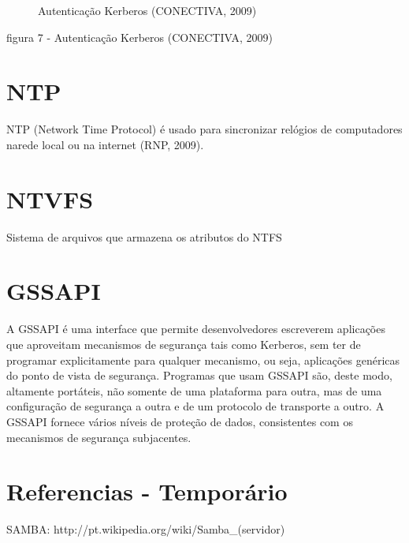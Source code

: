 \begin{figure}[ht]
   	\centering
   	\caption{Autenticação Kerberos (CONECTIVA, 2009)}
    \label{kerberos}
\end{figure}
figura 7 - Autenticação Kerberos (CONECTIVA, 2009)

\section{NTP}

NTP (Network Time Protocol) é usado para sincronizar relógios de computadores narede local ou na internet (RNP, 2009).

\section{NTVFS}

Sistema de arquivos que armazena os atributos do NTFS

\section{GSSAPI}

A GSSAPI é uma interface que permite desenvolvedores escreverem aplicações que aproveitam mecanismos de segurança tais como Kerberos, sem ter de programar explicitamente para qualquer mecanismo, ou seja, aplicações genéricas do ponto de vista de segurança. Programas que usam GSSAPI são, deste modo, altamente portáteis, não somente de uma plataforma para outra, mas de uma configuração de segurança a outra e de um protocolo de transporte a outro. A GSSAPI fornece vários níveis de proteção de dados, consistentes com os mecanismos de segurança subjacentes.


\section{Referencias - Temporário}
SAMBA:
http://pt.wikipedia.org/wiki/Samba\_(servidor)

